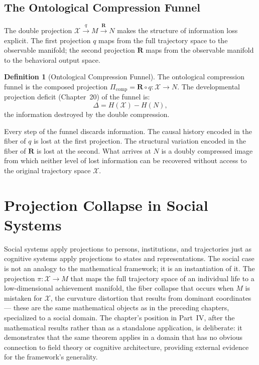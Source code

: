 \documentclass[12pt, oneside]{book}
\theoremstyle{flyxion}
\theoremstyle{definition}
\newtheorem{definition}[theorem]{Definition}
\begin{document}
\section{The Ontological Compression Funnel}

The double projection $\mathcal{X} \xrightarrow{q} M
\xrightarrow{\mathbf{R}} N$ makes the structure of
information loss explicit. The first projection $q$
maps from the full trajectory space to the observable
manifold; the second projection $\mathbf{R}$ maps
from the observable manifold to the behavioral output
space.

\begin{definition}[Ontological Compression Funnel]
The ontological compression funnel is the composed
projection $\Pi_\mathrm{comp} = \mathbf{R} \circ q :
\mathcal{X} \to N$. The developmental projection
deficit (Chapter~20) of the funnel is:
\[
\Delta = H(\mathcal{X}) - H(N),
\]
the information destroyed by the double compression.
\end{definition}

Every step of the funnel discards information. The
causal history encoded in the fiber of $q$ is lost
at the first projection. The structural variation
encoded in the fiber of $\mathbf{R}$ is lost at the
second. What arrives at $N$ is a doubly compressed
image from which neither level of lost information
can be recovered without access to the original
trajectory space $\mathcal{X}$.

\chapter{Projection Collapse in Social Systems}

Social systems apply projections to persons, institutions,
and trajectories just as cognitive systems apply
projections to states and representations. The social
case is not an analogy to the mathematical framework;
it is an instantiation of it. The projection
$\pi : \mathcal{X} \to M$ that maps the full trajectory
space of an individual life to a low-dimensional
achievement manifold, the fiber collapse that occurs
when $M$ is mistaken for $\mathcal{X}$, the curvature
distortion that results from dominant coordinates---
these are the same mathematical objects as in the
preceding chapters, specialized to a social domain.
The chapter's position in Part~IV, after the mathematical
results rather than as a standalone application, is
deliberate: it demonstrates that the same theorem
applies in a domain that has no obvious connection to
field theory or cognitive architecture, providing
external evidence for the framework's generality.
\end{document}

